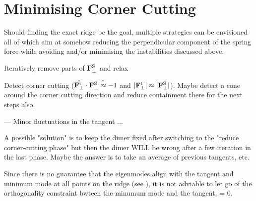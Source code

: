 \section{Minimising Corner Cutting}
\label{sec:erm-corner-cutting}

Should finding the exact ridge be the goal, multiple strategies can be envisioned all of which aim at somehow reducing the perpendicular component of the spring force while avoiding and/or minimising the instabilities discussed above.

\bit
\item Iteratively remove parts of ${\mathrm{\mathbf{\bm{F}}}}^\text{S}_\perp$ and relax
\item Detect corner cutting ($\hat{{\mathrm{\mathbf{\bm{F}}}}^\text{t}_\perp} \cdot \hat{{\mathrm{\mathbf{\bm{F}}}}^\text{S}_\perp \approx -1}$ and $|{\mathrm{\mathbf{\bm{F}}}}^\text{t}_\perp| \approx |{\mathrm{\mathbf{\bm{F}}}}^\text{S}_\perp|$). Maybe detect a cone around the corner cutting direction and reduce containment there for the next steps also.
\eit

--- Minor fluctuations in the tangent ... 

A possible "solution" is to keep the dimer fixed after switching to the "reduce corner-cutting phase" but then the dimer WILL be wrong after a few iteration in the last phase.
Maybe the answer is to take an average of previous tangents, etc.

Since there is no guarantee that the eigenmodes align with the tangent and minimum mode at all points on the ridge (see ), it is not adviable to let go of the orthogonality constraint bwteen the minumum mode and the tangent,
\uvn \cdot \uvt = 0.
\eeq

\incomplete
